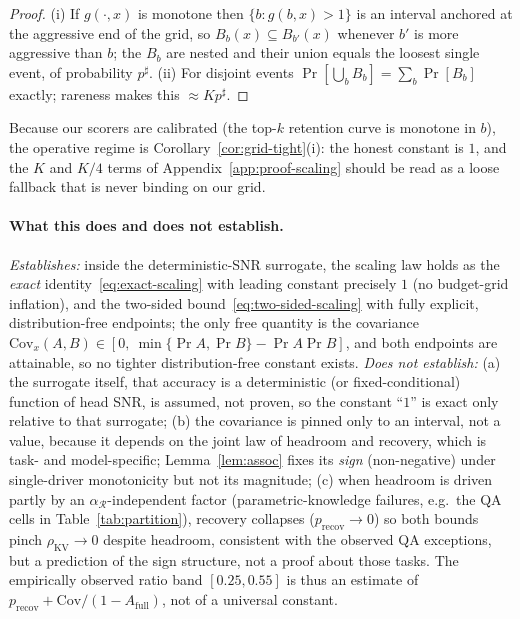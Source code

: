 \begin{proof}
(i) If $g(\cdot,x)$ is monotone then $\{b:g(b,x)>1\}$ is an interval anchored at
the aggressive end of the grid, so $B_{b}(x)\subseteq B_{b'}(x)$ whenever
$b'$ is more aggressive than $b$; the $B_b$ are nested and their union equals
the loosest single event, of probability $p^\sharp$. (ii) For disjoint events
$\Pr[\bigcup_b B_b]=\sum_b\Pr[B_b]$ exactly; rareness makes this
$\approx Kp^\sharp$.
\end{proof}

Because our scorers are calibrated (the top-$k$ retention curve is monotone in
$b$), the operative regime is Corollary~\ref{cor:grid-tight}(i): the honest
constant is $1$, and the $K$ and $K/4$ terms of
Appendix~\ref{app:proof-scaling} should be read as a loose fallback that is
never binding on our grid.

\paragraph{What this does and does not establish.}
\emph{Establishes:} inside the deterministic-SNR surrogate, the scaling law
holds as the \emph{exact} identity~\eqref{eq:exact-scaling} with leading
constant precisely $1$ (no budget-grid inflation), and the two-sided
bound~\eqref{eq:two-sided-scaling} with fully explicit, distribution-free
endpoints; the only free quantity is the covariance
$\mathrm{Cov}_x(A,B)\in[0,\ \min\{\Pr A,\Pr B\}-\Pr A\Pr B]$, and both endpoints
are attainable, so no tighter distribution-free constant exists.
\emph{Does not establish:} (a) the surrogate itself, that accuracy is a
deterministic (or fixed-conditional) function of head SNR, is assumed, not
proven, so the constant ``$1$'' is exact only relative to that surrogate; (b)
the covariance is pinned only to an interval, not a value, because it depends on
the joint law of headroom and recovery, which is task- and model-specific;
Lemma~\ref{lem:assoc} fixes its \emph{sign} (non-negative) under single-driver
monotonicity but not its magnitude; (c) when headroom is driven partly by an
$\alpha_{\mathcal{R}}$-independent factor (parametric-knowledge failures, e.g.\
the QA cells in Table~\ref{tab:partition}), recovery collapses
($p_{\mathrm{recov}}\!\to\!0$) so both bounds pinch $\rho_{\mathrm{KV}}\!\to\!0$
despite headroom, consistent with the observed QA exceptions, but a prediction
of the sign structure, not a proof about those tasks. The empirically observed
ratio band $[0.25,0.55]$ is thus an estimate of
$p_{\mathrm{recov}}+\mathrm{Cov}/(1-A_{\mathrm{full}})$, not of a universal
constant.

